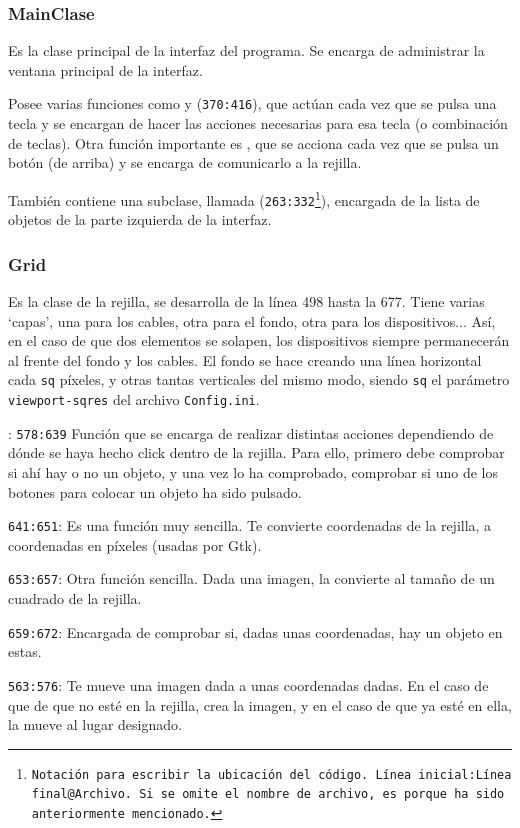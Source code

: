 \documentclass[a4paper, 11pt]{report} %
\begin{document}
\subsubsection{MainClase}
Es la clase principal de la interfaz del programa. Se encarga de administrar la ventana principal de la interfaz.

Posee varias funciones como  y  (\texttt{370:416}), que actúan cada vez que se pulsa una tecla y se encargan de hacer las acciones necesarias para esa tecla (o combinación de teclas). Otra función importante es , que se acciona cada vez que se pulsa un botón (de arriba) y se encarga de comunicarlo a la rejilla.

También contiene una subclase, llamada  (\texttt{263:332\footnote{Notación para escribir la ubicación del código. Línea inicial:Línea final@Archivo. Si se omite el nombre de archivo, es porque ha sido anteriormente mencionado.}}), encargada de la lista de objetos de la parte izquierda de la interfaz.

\newpage

\subsubsection{Grid}
Es la clase de la rejilla, se desarrolla de la línea 498 hasta la 677. Tiene varias `capas', una para los cables, otra para el fondo, otra para los dispositivos... Así, en el caso de que dos elementos se solapen, los dispositivos siempre permanecerán al frente del fondo y los cables. El fondo se hace creando una línea horizontal cada \texttt{sq} píxeles, y otras tantas verticales del mismo modo, siendo \texttt{sq} el parámetro \texttt{viewport-sqres} del archivo \texttt{Config.ini}.

\begin{description}
\item {}: \texttt{578:639} Función que se encarga de realizar distintas acciones dependiendo de dónde se haya hecho click dentro de la rejilla. Para ello, primero debe comprobar si ahí hay o no un objeto, y una vez lo ha comprobado, comprobar si uno de los botones para colocar un objeto ha sido pulsado.
\item {} \texttt{641:651}: Es una función muy sencilla. Te convierte coordenadas de la rejilla, a coordenadas en píxeles (usadas por Gtk).
\item {} \texttt{653:657}: Otra función sencilla. Dada una imagen, la convierte al tamaño de un cuadrado de la rejilla.
\item {} \texttt{659:672}: Encargada de comprobar si, dadas unas coordenadas, hay un objeto en estas.
\item {} \texttt{563:576}: Te mueve una imagen dada a unas coordenadas dadas. En el caso de que de que no esté en la rejilla, crea la imagen, y en el caso de que ya esté en ella, la mueve al lugar designado.
\end{description}
\end{document}
